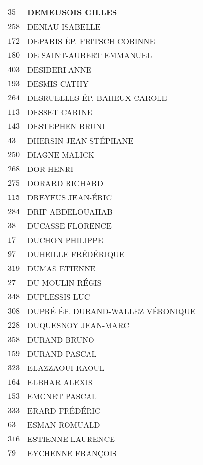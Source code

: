 \begin{xltabular}{\linewidth}{|l|X|}
    $35$ & DEMEUSOIS GILLES \\
    \hline
    $258$ & DENIAU ISABELLE \\
    \hline
    $172$ & DEPARIS ÉP. FRITSCH CORINNE \\
    \hline
    $180$ & DE SAINT-AUBERT EMMANUEL \\
    \hline
    $403$ & DESIDERI ANNE \\
    \hline
    $193$ & DESMIS CATHY \\
    \hline
    $264$ & DESRUELLES ÉP. BAHEUX CAROLE \\
    \hline
    $113$ & DESSET CARINE \\
    \hline
    $143$ & DESTEPHEN BRUNI \\
    \hline
    $43$ & DHERSIN JEAN-STÉPHANE \\
    \hline
    $250$ & DIAGNE MALICK \\
    \hline
    $268$ & DOR HENRI \\
    \hline
    $275$ & DORARD RICHARD \\
    \hline
    $115$ & DREYFUS JEAN-ÉRIC \\
    \hline
    $284$ & DRIF ABDELOUAHAB \\
    \hline
    $38$ & DUCASSE FLORENCE \\
    \hline
    $17$ & DUCHON PHILIPPE \\
    \hline
    $97$ & DUHEILLE FRÉDÉRIQUE \\
    \hline
    $319$ & DUMAS ETIENNE \\
    \hline
    $27$ & DU MOULIN RÉGIS \\
    \hline
    $348$ & DUPLESSIS LUC \\
    \hline
    $308$ & DUPRÉ ÉP. DURAND-WALLEZ VÉRONIQUE \\
    \hline
    $228$ & DUQUESNOY JEAN-MARC \\
    \hline
    $358$ & DURAND BRUNO \\
    \hline
    $159$ & DURAND PASCAL \\
    \hline
    $323$ & ELAZZAOUI RAOUL \\
    \hline
    $164$ & ELBHAR ALEXIS \\
    \hline
    $153$ & EMONET PASCAL \\
    \hline
    $333$ & ERARD FRÉDÉRIC \\
    \hline
    $63$ & ESMAN ROMUALD \\
    \hline
    $316$ & ESTIENNE LAURENCE \\
    \hline
    $79$ & EYCHENNE FRANÇOIS \\

\end{xltabular}
